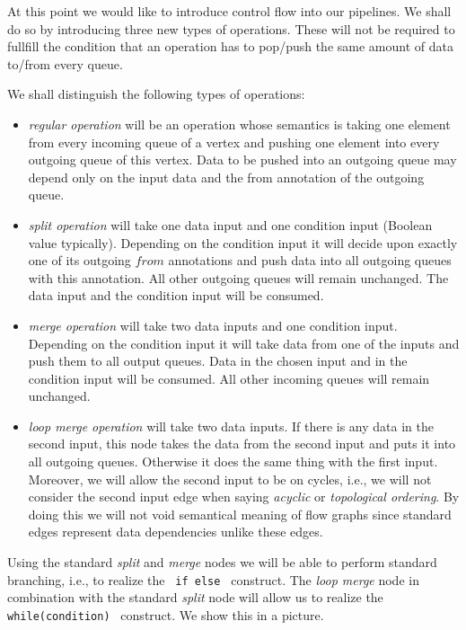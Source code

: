 At this point we would like to introduce control flow into our pipelines. We shall do so by introducing three new types of operations. These will not be required to fullfill the condition that an operation has to pop/push the same amount of data to/from every queue. 


\begin{define}
  We shall distinguish the following types of operations:
\begin{itemize}
  \item \emph{regular operation} will be an operation whose semantics is taking one element from every incoming queue of a vertex and pushing one element into every outgoing queue of this vertex. Data to be pushed into an outgoing queue may depend only on the input data and the from annotation of the outgoing queue.
  \item \emph{split operation} will take one data input and one condition input (Boolean value typically). Depending on the condition input it will decide upon exactly one of its outgoing $from$ annotations and push data into all outgoing queues with this annotation. All other outgoing queues will remain unchanged. The data input and the condition input will be consumed.
  \item \emph{merge operation} will take two data inputs and one condition input. Depending on the condition input it will take data from one of the inputs and push them to all output queues. Data in the chosen input and in the condition input will be consumed. All other incoming queues will remain unchanged.

  \item \emph{loop merge operation} will take two data inputs. If there is any data in the second input, this node takes the data from the second input and puts it into all outgoing queues. Otherwise it does the same thing with the first input. Moreover, we will allow the second input to be on cycles, i.e., we will not consider the second input edge when saying \emph{acyclic} or \emph{topological ordering}. By doing this we will not void semantical meaning of flow graphs since standard edges represent data dependencies unlike these edges.
\end{itemize}
\end{define}

Using the standard \emph{split} and \emph{merge} nodes we will be able to perform standard branching, i.e., to realize the \texttt{ if \string{\string} else \string{\string} } construct. The \emph{loop merge} node in combination with the standard \emph{split} node will allow us to realize the \texttt{ while(condition) \string{\string} } construct. We show this in a picture.

